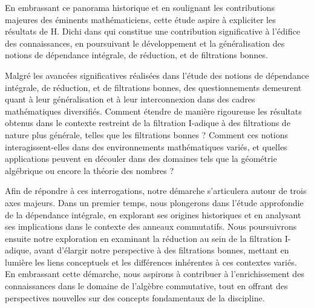 En embrassant ce panorama historique et en soulignant les contributions majeures des éminents mathématiciens, cette étude aspire à expliciter les résultats de H. Dichi dans \cite{2} qui constitue une contribution significative à l'édifice des connaissances, en poursuivant le développement et la généralisation des notions de dépendance intégrale, de réduction, et de filtrations bonnes.

Malgré les avancées significatives réalisées dans l'étude des notions de dépendance intégrale, de réduction, et de filtrations bonnes, des questionnements demeurent quant à leur généralisation et à leur interconnexion dans des cadres mathématiques diversifiés. Comment étendre de manière rigoureuse les résultats obtenus dans le contexte restreint de la filtration I-adique à des filtrations de nature plus générale, telles que les filtrations bonnes ? Comment ces notions interagissent-elles dans des environnements mathématiques variés, et quelles applications peuvent en découler dans des domaines tels que la géométrie algébrique ou encore la théorie des nombres ? 

Afin de répondre à ces interrogations, notre démarche s'articulera autour de trois axes majeurs. Dans un premier temps, nous plongerons dans l'étude approfondie de la dépendance intégrale, en explorant ses origines historiques et en analysant ses implications dans le contexte des anneaux commutatifs. Nous poursuivrons ensuite notre exploration en examinant la réduction au sein de la filtration I-adique, avant d'élargir notre perspective à des filtrations bonnes, mettant en lumière les liens conceptuels et les différences inhérentes à ces contextes variés. En embrassant cette démarche, nous aspirons à contribuer à l'enrichissement des connaissances dans le domaine de l'algèbre commutative, tout en offrant des perspectives nouvelles sur des concepts fondamentaux de la discipline.


